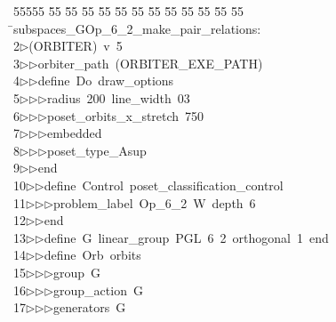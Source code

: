 %
%
\begin{tabbing}
55555 \= 55 \= 55 \= 55 \= 55 \= 55 \= 55 \= 55 \= 55 \= 55 \= 55 \= 55 \= 55 \= \>subspaces\_GOp\_6\_2\_make\_pair\_relations:\\[0pt]
2\>$\triangleright$\>(ORBITER)\ v\ 5\ \\[0pt]
3\>$\triangleright$\>$\triangleright$\>orbiter\_path\ (ORBITER\_EXE\_PATH)\ \\[0pt]
4\>$\triangleright$\>$\triangleright$\>define\ Do\ draw\_options\ \\[0pt]
5\>$\triangleright$\>$\triangleright$\>$\triangleright$\>radius\ 200\ line\_width\ 03\ \\[0pt]
6\>$\triangleright$\>$\triangleright$\>$\triangleright$\>poset\_orbits\_x\_stretch\ 750\ \\[0pt]
7\>$\triangleright$\>$\triangleright$\>$\triangleright$\>embedded\ \\[0pt]
8\>$\triangleright$\>$\triangleright$\>$\triangleright$\>poset\_type\_Asup\ \\[0pt]
9\>$\triangleright$\>$\triangleright$\>end\ \\[0pt]
10\>$\triangleright$\>$\triangleright$\>define\ Control\ poset\_classification\_control\ \\[0pt]
11\>$\triangleright$\>$\triangleright$\>$\triangleright$\>problem\_label\ Op\_6\_2\ W\ depth\ 6\ \\[0pt]
12\>$\triangleright$\>$\triangleright$\>end\ \\[0pt]
13\>$\triangleright$\>$\triangleright$\>define\ G\ linear\_group\ PGL\ 6\ 2\ orthogonal\ 1\ end\ \\[0pt]
14\>$\triangleright$\>$\triangleright$\>define\ Orb\ orbits\ \\[0pt]
15\>$\triangleright$\>$\triangleright$\>$\triangleright$\>group\ G\ \\[0pt]
16\>$\triangleright$\>$\triangleright$\>$\triangleright$\>group\_action\ G\ \\[0pt]
17\>$\triangleright$\>$\triangleright$\>$\triangleright$\>generators\ G\ \\[0pt]

\end{tabbing}
